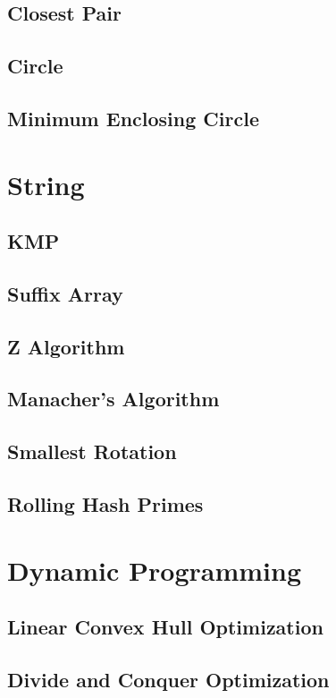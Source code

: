 \documentclass[a4paper,10pt,twocolumn,oneside]{article}
\begin{document}
\subsection{Closest Pair}

\subsection{Circle}

\subsection{Minimum Enclosing Circle}

\section{String}
\subsection{KMP}

\subsection{Suffix Array}

\subsection{Z Algorithm}

\subsection{Manacher's Algorithm}

\subsection{Smallest Rotation}

\subsection{Rolling Hash Primes}

\section{Dynamic Programming}
\subsection{Linear Convex Hull Optimization}

\subsection{Divide and Conquer Optimization}

\end{document}
